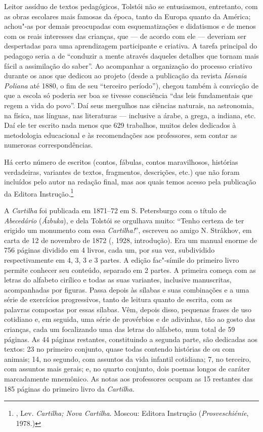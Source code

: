 Leitor assíduo de textos pedagógicos, Tolstói não se entusiasmou,
entretanto, com as obras escolares mais famosas da época, tanto da
Europa quanto da América; achou"-as por demais preocupadas com
esquematizações e didatismos e de menos com os reais interesses
das crianças, que --- de acordo com ele --- deveriam ser
despertadas para uma aprendizagem participante e criativa.
A tarefa principal do pedagogo seria a de ``conduzir a mente
através daqueles detalhes que tornam mais fácil a assimilação
do saber''. Ao acompanhar a organização do processo criativo
durante os anos que dedicou ao projeto (desde a publicação da
revista \emph{Iásnaia Poliana} até 1880, o fim de seu ``terceiro
período''), chegou também à convicção de que a escola só poderia
ser boa se tivesse consciência ``das leis fundamentais que regem
a vida do povo''. Daí seus mergulhos nas ciências naturais, na
astronomia, na física, nas línguas, nas literaturas --- inclusive
a árabe, a grega, a indiana, etc. Daí ele ter escrito nada menos
que 629 trabalhos, muitos deles dedicados à metodologia
educacional e às recomendações aos professores, sem contar
as numerosas correspondências. 

Há certo número de escritos (contos, fábulas, contos maravilhosos, histórias verdadeiras, variantes de textos, fragmentos, descrições, etc.) que não foram incluídos pelo autor na redação final, mas aos quais temos acesso pela publicação da Editora Instrução.\footnote{, Lev. \emph{Cartilha; Nova Cartilha}. Moscou: Editora Instrução (\emph{Prosveschiénie}, 1978.)}

A \emph{Cartilha} foi publicada em 1871--72 em S. Petersburgo com o título
de \emph{Abecedário} (\emph{Ázbuka}), e dela Tolstói se
orgulhava muito: ``Tenho certeza de ter erigido um monumento
com essa \emph{Cartilha!}'', escreveu ao amigo N. Strákhov, em
carta de 12 de novembro de 1872 (, 1928,
introdução). Era um manual enorme de 756 páginas dividido em
4 livros, cada um, por sua vez, subdividido respectivamente em
4, 3, 3 e 3 partes. A edição fac"-símile do primeiro livro permite
conhecer seu conteúdo, separado em 2 partes. A primeira começa
com as letras do alfabeto cirílico e todas as suas variantes,
inclusive   manuscritas, acompanhadas por figuras. Passa depois
às sílabas e suas combinações e a uma série de exercícios
progressivos, tanto de leitura quanto de escrita, com as
palavras compostas por essas sílabas. Vêm, depois disso,
pequenas frases de uso cotidiano e, em seguida, uma série de
provérbios e de adivinhas, tão ao gosto das crianças, cada um
focalizando uma das letras do alfabeto, num total de 59 páginas.
As 44 páginas restantes, constituindo a segunda parte, são
dedicadas aos textos: 23 no primeiro conjunto, quase todas
contendo histórias de ou com animais; 14, no segundo, com
assuntos da vida infantil cotidiana; 7, no terceiro, com
assuntos mais gerais; e, no quarto conjunto, dois poemas
longos de caráter marcadamente mnemônico. As notas aos
professores ocupam as 15 restantes das 185 páginas do
primeiro livro da \emph{Cartilha.}

